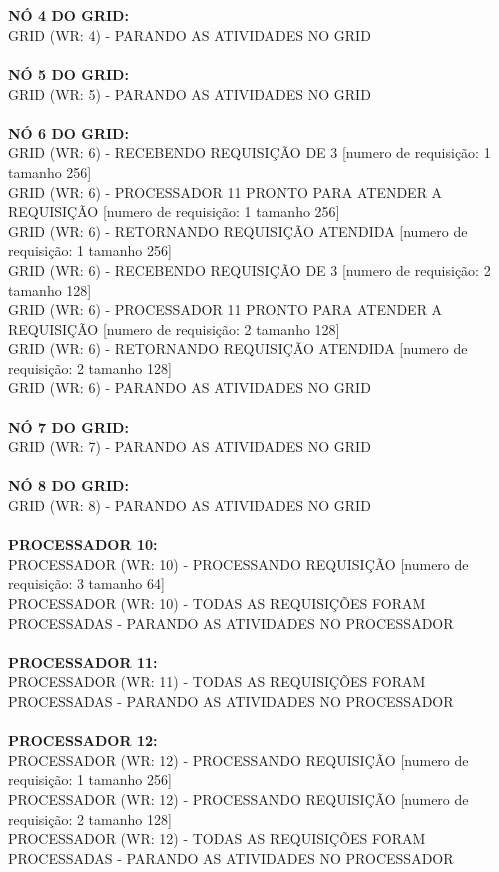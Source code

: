 \documentclass[12pt]{article}
\newcommand\tab[1][1cm]{\hspace*{#1}}
\begin{document}
\\
\\
\tab \textbf{NÓ 4 DO GRID:}
\\
\tab \tab GRID (WR: 4) - PARANDO AS ATIVIDADES NO GRID
\\
\\
\tab \textbf{NÓ 5 DO GRID:}
\\
\tab \tab GRID (WR: 5) - PARANDO AS ATIVIDADES NO GRID
\\
\\
\tab \textbf{NÓ 6 DO GRID:}
\\
\tab \tab GRID (WR: 6) - RECEBENDO REQUISIÇÃO DE 3 [numero de requisição: 1 tamanho 256]
\\
\tab \tab GRID (WR: 6) - PROCESSADOR 11 PRONTO PARA ATENDER A REQUISIÇÃO [numero de requisição: 1 tamanho 256]
\\
\tab \tab GRID (WR: 6) - RETORNANDO REQUISIÇÃO ATENDIDA [numero de requisição: 1 tamanho 256]
\\
\tab \tab GRID (WR: 6) - RECEBENDO REQUISIÇÃO DE 3 [numero de requisição: 2 tamanho 128]
\\
\tab \tab GRID (WR: 6) - PROCESSADOR 11 PRONTO PARA ATENDER A REQUISIÇÃO [numero de requisição: 2 tamanho 128]
\\
\tab \tab GRID (WR: 6) - RETORNANDO REQUISIÇÃO ATENDIDA [numero de requisição: 2 tamanho 128]
\\
\tab \tab GRID (WR: 6) - PARANDO AS ATIVIDADES NO GRID
\\
\\
\tab \textbf{NÓ 7 DO GRID:}
\\
\tab \tab GRID (WR: 7) - PARANDO AS ATIVIDADES NO GRID
\\
\\
\tab \textbf{NÓ 8 DO GRID:}
\\
\tab \tab GRID (WR: 8) - PARANDO AS ATIVIDADES NO GRID
\\
\\
\tab \textbf{PROCESSADOR 10:}
\\
\tab \tab PROCESSADOR (WR: 10) - PROCESSANDO REQUISIÇÃO [numero de requisição: 3 tamanho 64]
\\
\tab \tab PROCESSADOR (WR: 10) - TODAS AS REQUISIÇÕES FORAM PROCESSADAS - PARANDO AS ATIVIDADES NO PROCESSADOR
\\
\\
\tab \textbf{PROCESSADOR 11:}
\\
\tab \tab PROCESSADOR (WR: 11) - TODAS AS REQUISIÇÕES FORAM PROCESSADAS - PARANDO AS ATIVIDADES NO PROCESSADOR
\\
\\
\tab \textbf{PROCESSADOR 12:}
\\
\tab \tab PROCESSADOR (WR: 12) - PROCESSANDO REQUISIÇÃO [numero de requisição: 1 tamanho 256]
\\
\tab \tab PROCESSADOR (WR: 12) - PROCESSANDO REQUISIÇÃO [numero de requisição: 2 tamanho 128]
\\
\tab \tab PROCESSADOR (WR: 12) - TODAS AS REQUISIÇÕES FORAM PROCESSADAS - PARANDO AS ATIVIDADES NO PROCESSADOR
\\
\\
\end{document}
